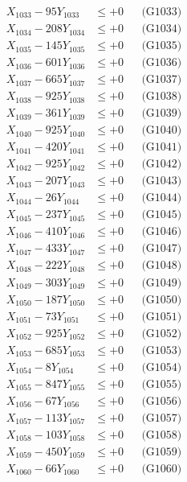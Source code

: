 \documentclass[a4paper,10pt]{article}
\begin{document}
{\begin{align}
X_{1033} - 95Y_{1033} &\leq +0 && \text{(G1033)} \\
X_{1034} - 208Y_{1034} &\leq +0 && \text{(G1034)} \\
X_{1035} - 145Y_{1035} &\leq +0 && \text{(G1035)} \\
X_{1036} - 601Y_{1036} &\leq +0 && \text{(G1036)} \\
X_{1037} - 665Y_{1037} &\leq +0 && \text{(G1037)} \\
X_{1038} - 925Y_{1038} &\leq +0 && \text{(G1038)} \\
X_{1039} - 361Y_{1039} &\leq +0 && \text{(G1039)} \\
X_{1040} - 925Y_{1040} &\leq +0 && \text{(G1040)} \\
\allowbreak
X_{1041} - 420Y_{1041} &\leq +0 && \text{(G1041)} \\
X_{1042} - 925Y_{1042} &\leq +0 && \text{(G1042)} \\
X_{1043} - 207Y_{1043} &\leq +0 && \text{(G1043)} \\
X_{1044} - 26Y_{1044} &\leq +0 && \text{(G1044)} \\
X_{1045} - 237Y_{1045} &\leq +0 && \text{(G1045)} \\
X_{1046} - 410Y_{1046} &\leq +0 && \text{(G1046)} \\
X_{1047} - 433Y_{1047} &\leq +0 && \text{(G1047)} \\
X_{1048} - 222Y_{1048} &\leq +0 && \text{(G1048)} \\
X_{1049} - 303Y_{1049} &\leq +0 && \text{(G1049)} \\
X_{1050} - 187Y_{1050} &\leq +0 && \text{(G1050)} \\
\allowbreak
X_{1051} - 73Y_{1051} &\leq +0 && \text{(G1051)} \\
X_{1052} - 925Y_{1052} &\leq +0 && \text{(G1052)} \\
X_{1053} - 685Y_{1053} &\leq +0 && \text{(G1053)} \\
X_{1054} - 8Y_{1054} &\leq +0 && \text{(G1054)} \\
X_{1055} - 847Y_{1055} &\leq +0 && \text{(G1055)} \\
X_{1056} - 67Y_{1056} &\leq +0 && \text{(G1056)} \\
X_{1057} - 113Y_{1057} &\leq +0 && \text{(G1057)} \\
X_{1058} - 103Y_{1058} &\leq +0 && \text{(G1058)} \\
X_{1059} - 450Y_{1059} &\leq +0 && \text{(G1059)} \\
X_{1060} - 66Y_{1060} &\leq +0 && \text{(G1060)} \\

\end{align}}
\end{document}
